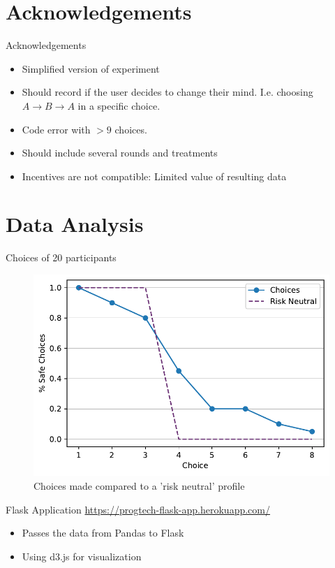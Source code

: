 \documentclass[10pt]{beamer}
\begin{document}
\section{Acknowledgements}
\begin{frame}[fragile]{Acknowledgements}
  \begin{itemize}
    \item Simplified version of experiment
    \item Should record if the user decides to change their mind. I.e. choosing $A \rightarrow B \rightarrow A$ in a specific choice. 
    \item Code error with $> 9$ choices.
    \item Should include several rounds and treatments
    \item Incentives are not compatible: Limited value of resulting data
  \end{itemize}
\end{frame}

\section{Data Analysis}

\begin{frame}{Choices of 20 participants}
  \begin{figure}[H]
  \includegraphics[width=0.9\columnwidth]{graphics/aggregate_plot.pdf}
  \caption{Choices made compared to a 'risk neutral' profile}
\end{figure}
\end{frame}

\begin{frame}{Flask Application}
  \url{https://progtech-flask-app.herokuapp.com/}
  \begin{itemize}
    \item Passes the data from Pandas to Flask
    \item Using d3.js for visualization
  \end{itemize}
\end{frame}
\end{document}
